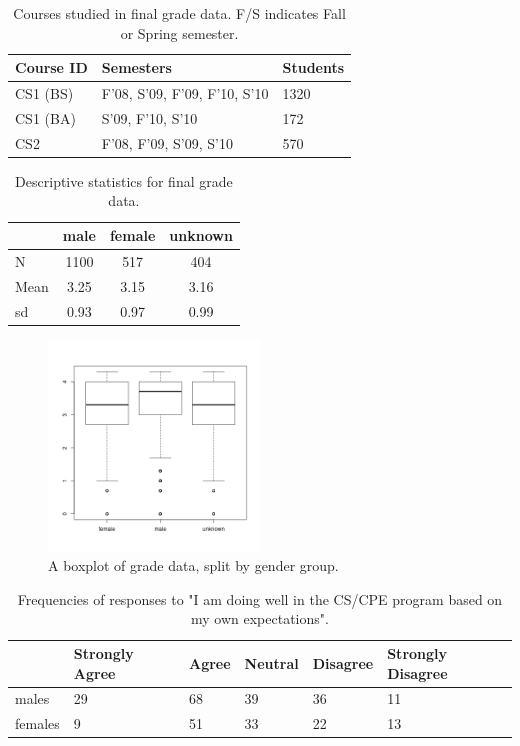 \documentclass[a4paper,man,natbib]{apa6}
\begin{document}
\begin{table}
\begin{tabular}{l|l|l}
Course ID	& Semesters						& Students \\\hline
CS1 (BS)	& F'08, S'09, F'09, F'10, S'10	& 1320 \\
CS1 (BA)	& S'09, F'10, S'10				& 172 \\
CS2			& F'08, F'09, S'09, S'10		& 570
\end{tabular}
\caption{\label{tab:courses}Courses studied in final grade data. F/S indicates Fall or Spring semester.}
\end{table}

\begin{table}
\begin{tabular}{l|c|c|c}
		& male	& female	& unknown \\\hline
N		& 1100	& 517		& 404 \\
Mean	& 3.25	& 3.15		& 3.16 \\
sd		& 0.93	& 0.97		& 0.99
\end{tabular}
\caption{\label{tab:descriptive}Descriptive statistics for final grade data.}
\end{table}

\begin{figure}
\includegraphics[width=0.5\textwidth]{boxplot.png}
\caption{\label{fig:boxplot}A boxplot of grade data, split by gender group.}
\end{figure}

\begin{table}
\begin{tabular}{l|l|l|l|l|l}
		& Strongly Agree	& Agree	& Neutral	& Disagree	& Strongly Disagree \\\hline
males	& 29				& 68	& 39		& 36		& 11 \\
females & 9					& 51	& 33		& 22		& 13
\end{tabular}
\caption{\label{tab:expec-own}Frequencies of responses to "I am doing well in the CS/CPE program based on my own expectations".}
\end{table}
\end{document}
